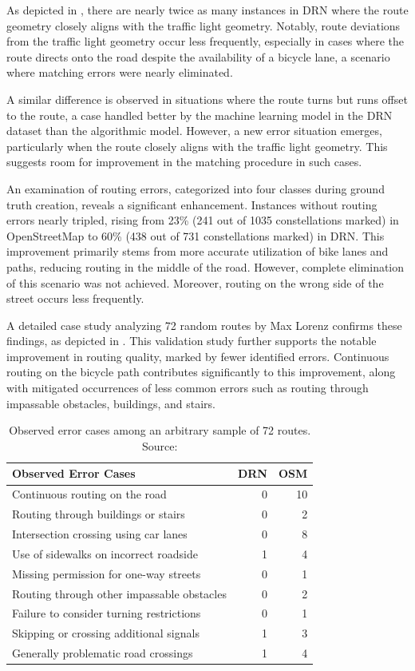 As depicted in , there are nearly twice as many instances in DRN where the route geometry closely aligns with the traffic light geometry. Notably, route deviations from the traffic light geometry occur less frequently, especially in cases where the route directs onto the road despite the availability of a bicycle lane, a scenario where matching errors were nearly eliminated. 

A similar difference is observed in situations where the route turns but runs offset to the route, a case handled better by the machine learning model in the DRN dataset than the algorithmic model. However, a new error situation emerges, particularly when the route closely aligns with the traffic light geometry. This suggests room for improvement in the matching procedure in such cases.

An examination of routing errors, categorized into four classes during ground truth creation, reveals a significant enhancement. Instances without routing errors nearly tripled, rising from 23\% (241 out of 1035 constellations marked) in OpenStreetMap to 60\% (438 out of 731 constellations marked) in DRN. This improvement primarily stems from more accurate utilization of bike lanes and paths, reducing routing in the middle of the road. However, complete elimination of this scenario was not achieved. Moreover, routing on the wrong side of the street occurs less frequently.

A detailed case study analyzing 72 random routes by Max Lorenz \cite{lorenz_2022} confirms these findings, as depicted in . This validation study further supports the notable improvement in routing quality, marked by fewer identified errors. Continuous routing on the bicycle path contributes significantly to this improvement, along with mitigated occurrences of less common errors such as routing through impassable obstacles, buildings, and stairs.

\begin{table}[t]
\centering
\begin{tabular}{@{}lrr@{}}
\hline
\textbf{Observed Error Cases} & \textbf{DRN} & \textbf{OSM} \\ \hline
Continuous routing on the road & 0 & 10 \\
Routing through buildings or stairs & 0 & 2 \\
Intersection crossing using car lanes & 0 & 8 \\
Use of sidewalks on incorrect roadside & 1 & 4 \\
Missing permission for one-way streets & 0 & 1 \\
Routing through other impassable obstacles & 0 & 2 \\
Failure to consider turning restrictions & 0 & 1 \\
Skipping or crossing additional signals & 1 & 3 \\
Generally problematic road crossings & 1 & 4 \\
\hline
\end{tabular}
\caption{Observed error cases among an arbitrary sample of 72 routes. Source: \cite{lorenz_2022}}%
\label{tab:error-cases-max-lorenz}%
\end{table}

